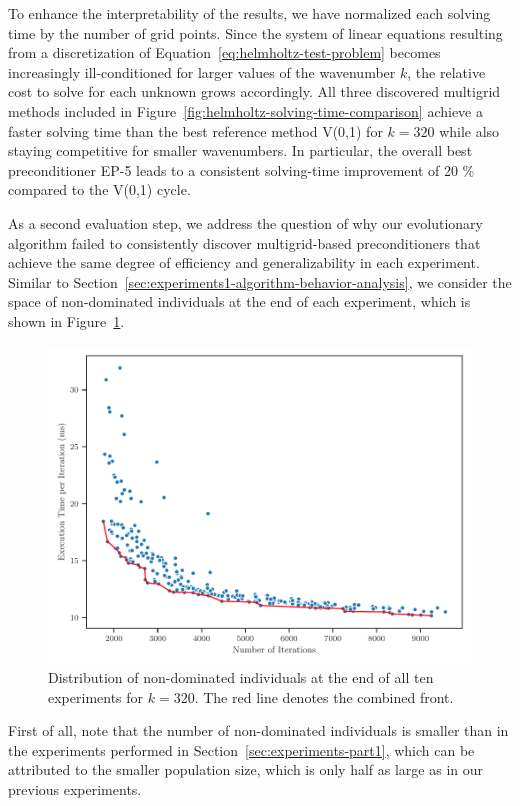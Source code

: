 To enhance the interpretability of the results, we have normalized each solving time by the number of grid points.
Since the system of linear equations resulting from a discretization of Equation~\ref{eq:helmholtz-test-problem} becomes increasingly ill-conditioned for larger values of the wavenumber $k$, the relative cost to solve for each unknown grows accordingly.
All three discovered multigrid methods included in Figure~\ref{fig:helmholtz-solving-time-comparison} achieve a faster solving time than the best reference method V(0,1) for $k = 320$ while also staying competitive for smaller wavenumbers.
In particular, the overall best preconditioner EP-5 leads to a consistent solving-time improvement of 20 \% compared to the V(0,1) cycle.

As a second evaluation step, we address the question of why our evolutionary algorithm failed to consistently discover multigrid-based preconditioners that achieve the same degree of efficiency and generalizability in each experiment.
Similar to Section~\ref{sec:experiments1-algorithm-behavior-analysis}, we consider the space of non-dominated individuals at the end of each experiment, which is shown in Figure~\ref{fig:pareto-front-helmholtz}.
\begin{figure}
\centering
	\includegraphics[scale=0.725]{figures/pareto-front.pdf}
	\caption{Distribution of non-dominated individuals at the end of all ten experiments for $k = 320$. The red line denotes the combined front.}
	\label{fig:pareto-front-helmholtz}
\end{figure}
First of all, note that the number of non-dominated individuals is smaller than in the experiments performed in Section~\ref{sec:experiments-part1}, which can be attributed to the smaller population size, which is only half as large as in our previous experiments.

